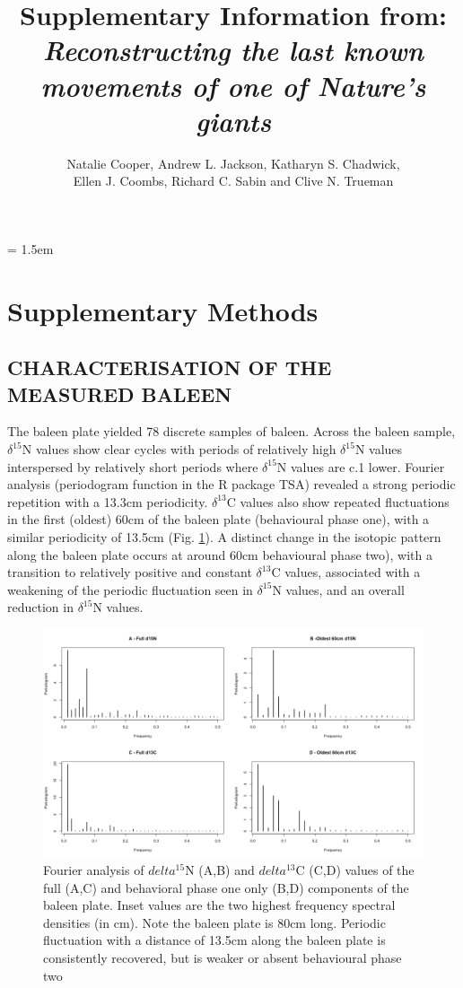 \documentclass[a4paper,12pt]{article}
\title{Supplementary Information from:\\
\textit{Reconstructing the last known movements of one of Nature's giants}}
\author{Natalie Cooper, Andrew L. Jackson, Katharyn S. Chadwick,\\ 
Ellen J. Coombs, Richard C. Sabin and Clive N. Trueman}
\date{}
\begin{document}

\maketitle

\parindent = 1.5em
\addtolength{\parskip}{.3em}


\section*{Supplementary Methods}
 
\subsection*{CHARACTERISATION OF THE MEASURED BALEEN}
The baleen plate yielded 78 discrete samples of baleen. 
Across the baleen sample, $\delta^{15}$N values show clear cycles with periods of relatively high $\delta^{15}$N values interspersed by relatively short periods where $\delta^{15}$N values are c.1\text{\textperthousand} lower. 
Fourier analysis (periodogram function in the R package TSA\cite{Chan:2012aa}) revealed a strong periodic repetition with a 13.3cm periodicity. 
$\delta^{13}$C values also show repeated fluctuations in the first (oldest) 60cm of the baleen plate (behavioural phase one), with a similar periodicity of 13.5cm (Fig. \ref{figs1}). 
A distinct change in the isotopic pattern along the baleen plate occurs at around 60cm behavioural phase two), with a transition to relatively positive and constant $\delta^{13}$C values, associated with a weakening of the periodic fluctuation seen in $\delta^{15}$N values, and an overall reduction in $\delta^{15}$N values.

\begin{figure}[!htbp]
  \centering
  \includegraphics[width = \linewidth]{figures/Figure-S1-periodograms.png}
  \caption{Fourier analysis of $delta^{15}$N (A,B) and $delta^{13}$C (C,D) values of the full (A,C) and behavioral phase one only (B,D) components of the baleen plate. Inset values are the two highest frequency spectral densities (in cm). Note the baleen plate is 80cm long. Periodic fluctuation with a distance of 13.5cm along the baleen plate is consistently recovered, but is weaker or absent behavioural phase two} %
  \label{figs1}
\end{figure}
 
\end{document}
